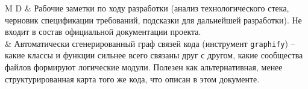\begin{xltabular}{\textwidth}{M D}
 & Рабочие заметки по ходу разработки (анализ
  технологического стека, черновик спецификации требований, подсказки
  для дальнейшей разработки). Не входит в состав официальной
  документации проекта. \\
 & Автоматически сгенерированный
  граф связей кода (инструмент \texttt{graphify}) -- какие классы и
  функции сильнее всего связаны друг с другом, какие сообщества файлов
  формируют логические модули. Полезен как альтернативная, менее
  структурированная карта того же кода, что описан в этом документе. \\
\end{xltabular}



